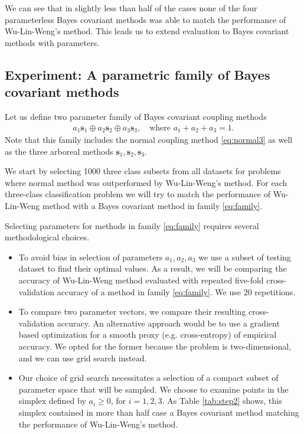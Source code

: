 

We can see that in slightly less than half of the cases none of the four parameterless Bayes covariant methods was able to match the performance of Wu-Lin-Weng's method. This leads us to extend evaluation to Bayes covariant methods with parameters. 

\subsection{Experiment: A parametric family of Bayes covariant methods}
\label{sec:exp3}

Let us define two parameter family of Bayes covariant coupling methods
\begin{align}
a_1 \boldsymbol{s}_1 \oplus a_2 \boldsymbol{s}_2 \oplus a_3 \boldsymbol{s}_3,\quad\textrm{where } a_1 + a_2 +a_3 = 1. \label{eq:family}
\end{align}
Note that this family includes the normal coupling method \eqref{eq:normal3} as well as the three arboreal methods $\boldsymbol{s}_1, \boldsymbol{s}_2, \boldsymbol{s}_3$.

We start by selecting 1000 three class subsets from all datasets for problems where normal method was outperformed by Wu-Lin-Weng's method. For each three-class classification problem we will try to match the performance of Wu-Lin-Weng method with a Bayes covariant method in family \eqref{eq:family}.

Selecting parameters for methods in family \eqref{eq:family} requires several methodological choices. 
\begin{itemize}
\item To avoid bias in selection of parameters $a_1, a_2, a_3$ we use a subset of testing dataset to find their optimal values. As a result, we will be comparing the accuracy of Wu-Lin-Weng method evaluated with repeated five-fold cross-validation accuracy of a method in family \eqref{eq:family}. We use 20 repetitions.
\item To compare two parameter vectors, we compare their resulting cross-validation accuracy. An alternative approach would be to use  a gradient based optimization for a smooth proxy (e.g. cross-entropy) of empirical accuracy. We opted for the former because the problem is two-dimensional, and we can use grid search instead.
\item Our choice of grid search necessitates a selection of a compact subset of parameter space that will be sampled. We choose to examine points in the simplex defined by  $a_i\geq 0$, for $i=1,2,3$. As Table \ref{tab:step2} shows, this simplex contained in more than half case a Bayes covariant method matching the performance of Wu-Lin-Weng's method.
\end{itemize}


